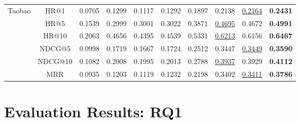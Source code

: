 \begin{table*}[h]
{\begin{tabular}{c|c|cc|ccc|ccc}
			\hline
			\hline
			\multirow{6}{*}{Taobao} & HR@1 & 0.0705 & 0.1299 & 0.1117 & 0.1292 & 0.1897 & 0.2138 & \underline{0.2164} & \textbf{0.2431} \\
			& HR@5 & 0.1539 & 0.2999 & 0.3001 & 0.3022 & 0.3871 & \underline{0.4695} & 0.4672 & \textbf{0.4991} \\
			& HR@10 & 0.2063 & 0.4656 & 0.4395 & 0.4539 & 0.5331 & \underline{0.6213} & 0.6156 & \textbf{0.6467} \\
			& NDCG@5 & 0.0998 & 0.1719 & 0.1667 & 0.1724 & 0.2512 & 0.3447 & \underline{0.3449} & \textbf{0.3590} \\
			& NDCG@10 & 0.1082 & 0.2008 & 0.1995 & 0.2013 & 0.2788 & \underline{0.3937} & 0.3929 & \textbf{0.4112} \\
			& MRR & 0.0935 & 0.1203 & 0.1119 & 0.1232 & 0.2198 & 0.3402 & \underline{0.3411} & \textbf{0.3786} \\
			\hline
		\end{tabular}
	}
\end{table*}

\section{Evaluation Results: RQ1} \label{sec:comp_results}

